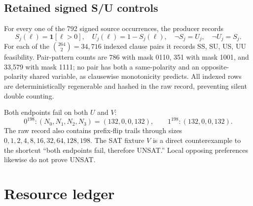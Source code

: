 \documentclass[11pt]{article}
\begin{document}
\subsection{Retained signed S/U controls}

For every one of the 792 signed source occurrences, the producer records
\[
S_j(\ell)=\mathbf 1[\ell>0],\quad U_j(\ell)=1-S_j(\ell),
\quad \neg S_j=U_j,\quad \neg U_j=S_j.
\]
For each of the $\binom{264}{2}=34{,}716$ indexed clause pairs it records SS, SU, US,
UU feasibility.  Pair-pattern counts are 786 with mask 0110, 351 with mask 1001, and
33,579 with mask 1111; no pair has both a same-polarity and an opposite-polarity shared
variable, as clausewise monotonicity predicts.  All indexed rows are deterministically
regenerable and hashed in the raw record, preventing silent double counting.

Both endpoints fail on both $U$ and $V$:
\[
0^{198}: (N_0,N_1,N_2,N_3)=(132,0,0,132),\qquad
1^{198}: (132,0,0,132).
\]
The raw record also contains prefix-flip trails through sizes
$0,1,2,4,8,16,32,64,128,198$.  The SAT fixture $V$ is a direct counterexample to the
shortcut ``both endpoints fail, therefore UNSAT.''  Local opposing preferences likewise
do not prove UNSAT.

\section{Resource ledger}
\end{document}
